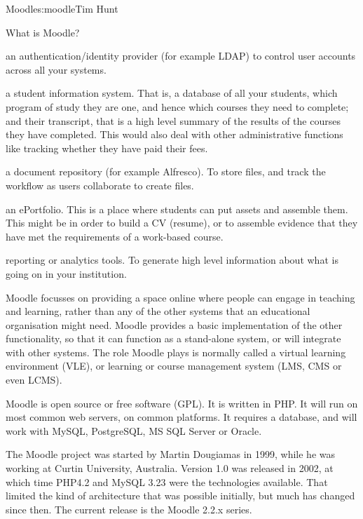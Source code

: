 \begin{aosachapter}{Moodle}{s:moodle}{Tim Hunt}
\begin{aosasect1}{What is Moodle?}
\begin{aosaitemize}

\item an authentication/identity provider (for example LDAP) to
  control user accounts across all your systems.


\item a student information system. That is, a database of all your
  students, which program of study they are one, and hence which
  courses they need to complete; and their transcript, that is a high
  level summary of the results of the courses they have
  completed. This would also deal with other administrative functions
  like tracking whether they have paid their fees.


\item a document repository (for example Alfresco). To store files,
  and track the workflow as users collaborate to create files.


\item an ePortfolio. This is a place where students can put assets and
  assemble them. This might be in order to build a CV (resume), or to
  assemble evidence that they have met the requirements of a
  work-based course.


\item reporting or analytics tools. To generate high level information
  about what is going on in your institution.

\end{aosaitemize}

Moodle focusses on providing a space online where people can engage in
teaching and learning, rather than any of the other systems that an
educational organisation might need. Moodle provides a basic
implementation of the other functionality, so that it can function as
a stand-alone system, or will integrate with other systems. The role
Moodle plays is normally called a virtual learning environment (VLE),
or learning or course management system (LMS, CMS or even LCMS).

Moodle is open source or free software (GPL). It is written in PHP. It
will run on most common web servers, on common platforms. It requires
a database, and will work with MySQL, PostgreSQL, MS SQL Server or
Oracle.

The Moodle project was started by Martin Dougiamas in 1999, while he
was working at Curtin University, Australia. Version 1.0 was released
in 2002, at which time PHP4.2 and MySQL 3.23 were the technologies
available. That limited the kind of architecture that was possible
initially, but much has changed since then. The current release is the
Moodle 2.2.x series.


\end{aosasect1}
\end{aosachapter}
